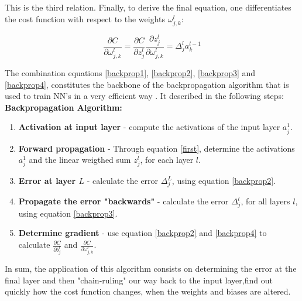 This is the third relation. Finally, to derive the final equation, one differentiates the cost function with respect to the weights $\omega_{j,k}^l:$

\begin{equation}
	\frac{\partial C}{\partial \omega_{j,k}^l} =\frac{\partial C}{\partial z_{j}^l}\frac{\partial z_{j}^l}{\partial \omega_{j,k}^l} = \Delta_j^{l} a_k^{l-1}
	\label{backprop4}
\end{equation}

The combination equations \ref{backprop1}, \ref{backprop2}, \ref{backprop3} and \ref{backprop4}, constitutes the backbone of the backpropagation algorithm that is used to train NN's in a very efficient way \cite{ml_phys}. It described in the following steps:
\\

\textbf{Backpropagation Algorithm:}
\begin{enumerate}
	\item \textbf{Activation at input layer} - compute the activations of the input layer $a_j^1$.
	\item \textbf{Forward propagation} - Through equation \ref{first}, determine the activations $a_j^1$ and the linear weigthed sum $z_j^l$, for each layer $l$.
	\item \textbf{Error at layer $L$} - calculate the error $\Delta_j^L $, using equation \ref{backprop2}.
	\item \textbf{Propagate the error "backwards"} - calculate the error $\Delta_j^l$, for all layers $l$, using equation \ref{backprop3}. 
	\item \textbf{Determine gradient} - use equation \ref{backprop2} and \ref{backprop4} to calculate  $\frac{\partial C}{\partial b_j^l}$ and $\frac{\partial C}{\partial \omega_{j,k}^l}$.
\end{enumerate}
\cite{ml_phys}

In sum, the application  of this algorithm consists on determining the error at the final layer and then "chain-ruling" our way back to the input layer,find out quickly how the cost function changes, when the weights and biases are altered. \cite{nielsenneural}


